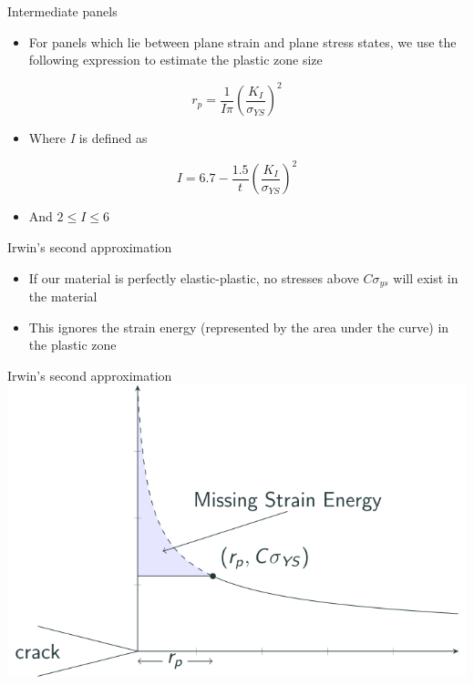 \documentclass[
  letterpaper,
  ignorenonframetext,
  aspectratio=43,
  handout,
  12pt]{beamer}
\providecommand{\tightlist}{%
  \setlength{\itemsep}{0pt}\setlength{\parskip}{0pt}}
\providecommand{\tightlist}{%
\setlength{\itemsep}{0pt}\setlength{\parskip}{0pt}}
\let\Oldincludegraphics\includegraphics
\renewcommand{\includegraphics}[2][]{\Oldincludegraphics[width=\textwidth,height=0.7\textheight,keepaspectratio]{#2}}
\begin{document}
\begin{frame}{Intermediate panels}
\protect\hypertarget{intermediate-panels}{}
\begin{itemize}
\tightlist
\item
  For panels which lie between plane strain and plane stress states, we
  use the following expression to estimate the plastic zone size
\end{itemize}

\[r_p = \frac{1}{I\pi} \left(\frac{K_I}{\sigma_{YS}}\right)^2\]

\begin{itemize}
\tightlist
\item
  Where \emph{I} is defined as
\end{itemize}

\[I = 6.7 - \frac{1.5}{t}\left(\frac{K_I}{\sigma_{YS}}\right)^2\]

\begin{itemize}
\tightlist
\item
  And \(2 \le I \le 6\)
\end{itemize}
\end{frame}

\begin{frame}{Irwin's second approximation}
\protect\hypertarget{irwins-second-approximation}{}
\begin{itemize}
\tightlist
\item
  If our material is perfectly elastic-plastic, no stresses above
  \(C\sigma_{ys}\) will exist in the material
\item
  This ignores the strain energy (represented by the area under the
  curve) in the plastic zone
\end{itemize}
\end{frame}

\begin{frame}{Irwin's second approximation}
\protect\hypertarget{irwins-second-approximation-1}{}
\includegraphics{../images/plastic-missing.svg}
\end{frame}
\end{document}
